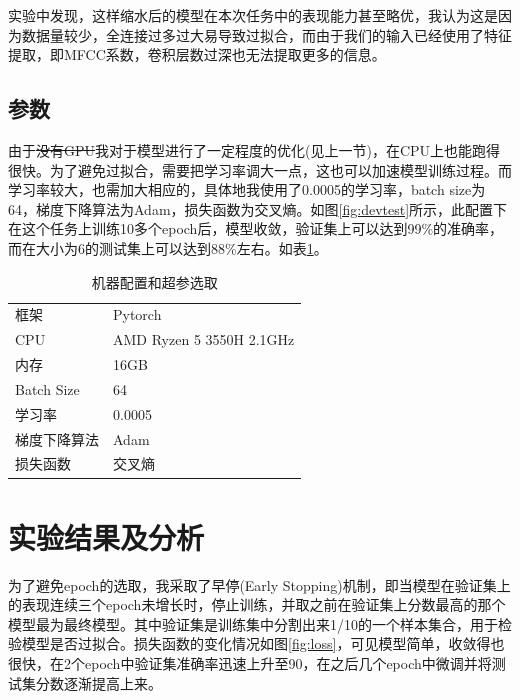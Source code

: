 \documentclass[12pt]{article} %
\begin{document}
实验中发现，这样缩水后的模型在本次任务中的表现能力甚至略优，我认为这是因为数据量较少，全连接过多过大易导致过拟合，而由于我们的输入已经使用了特征提取，即MFCC系数，卷积层数过深也无法提取更多的信息。

\subsection{参数}

由于\sout{没有GPU}我对于模型进行了一定程度的优化(见上一节)，在CPU上也能跑得很快。为了避免过拟合，需要把学习率调大一点，这也可以加速模型训练过程。而学习率较大，也需加大相应的，具体地我使用了0.0005的学习率，batch size为64，梯度下降算法为Adam，损失函数为交叉熵。如图\ref{fig:devtest}所示，此配置下在这个任务上训练10多个epoch后，模型收敛，验证集上可以达到99\%的准确率，而在大小为6的测试集上可以达到88\%左右。如表\ref{tb:params}。


\begin{table}[ht]
\caption{机器配置和超参选取}
\label{tb:params}
\centering
\begin{tabular}{ll}
\hline
框架 & Pytorch \\ 
CPU & AMD Ryzen 5 3550H 2.1GHz\\
内存 & 16GB \\
Batch Size & 64 \\
学习率 & 0.0005\\
梯度下降算法 & Adam \\
损失函数 & 交叉熵 \\


\hline
\end{tabular} 
\end{table}

\section{实验结果及分析}
为了避免epoch的选取，我采取了早停(Early Stopping)机制，即当模型在验证集上的表现连续三个epoch未增长时，停止训练，并取之前在验证集上分数最高的那个模型最为最终模型。其中验证集是训练集中分割出来1/10的一个样本集合，用于检验模型是否过拟合。损失函数的变化情况如图\ref{fig:loss}，可见模型简单，收敛得也很快，在2个epoch中验证集准确率迅速上升至90，在之后几个epoch中微调并将测试集分数逐渐提高上来。
\end{document}
